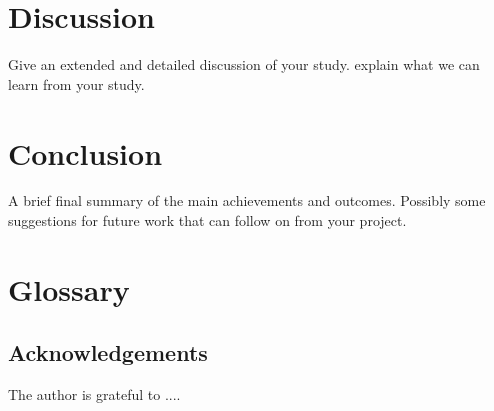 \documentclass[a4paper,12pt]{article}
\begin{document}
\newpage
\section{Discussion}
%
Give an extended and detailed discussion of your study. explain what we can learn from your study.
%

\section{Conclusion}
%
A brief final summary of the main achievements and outcomes. Possibly some suggestions for future work that can follow on from your project.%


\section{Glossary}
%
\subsection*{Acknowledgements}
The author is grateful to ....
%
\vskip 0.2in
\newpage


\end{document}
